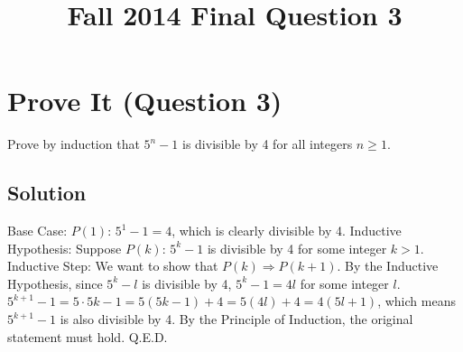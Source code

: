 \documentclass{article}
\title{Fall 2014 Final Question 3}
\begin{document}
\maketitle

\section{Prove It (Question 3)}
Prove by induction that $5^n - 1$ is divisible by 4 for all integers $n \geq 1$.

\subsection{Solution}
Base Case: $P(1)$: $5^1 - 1 = 4$, which is clearly divisible by 4.
\newline Inductive Hypothesis: Suppose $P(k)$: $5^k − 1$ is divisible by 4 for some integer $k > 1$.
\newline Inductive Step: We want to show that $P(k) \Rightarrow P({k+1})$.
\newline By the Inductive Hypothesis, since $5^k - l$ is divisible by 4, $5^k - 1 = 4l$ for some integer $l$. $5^{k+1} - 1 = 5 \cdot 5k - 1 = 5 (5k - 1) + 4 = 5(4l) + 4 = 4(5l + 1)$, which means $5^{k+1} - 1$ is also divisible by 4. By the Principle of Induction, the original statement must hold. Q.E.D.
\end{document}
